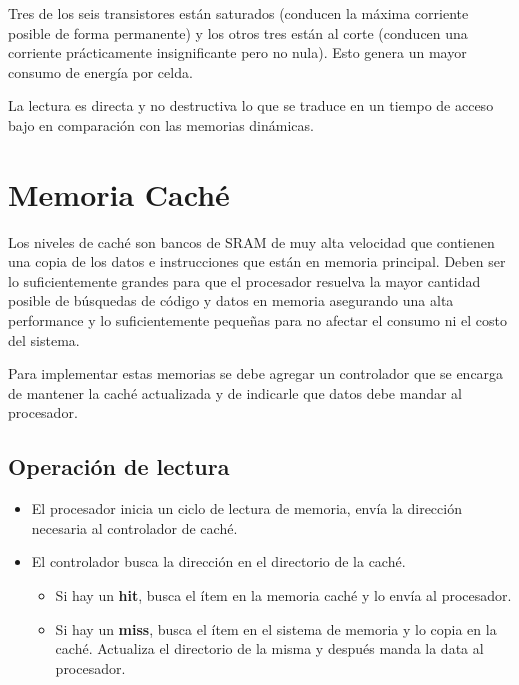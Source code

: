 \begin{itemize}
\begin{itemize}
 		Tres de los seis transistores están saturados (conducen la máxima corriente posible de forma permanente) y los otros tres están al corte (conducen una corriente prácticamente insignificante pero no nula). Esto genera un mayor consumo de energía por celda.
 		
 		La lectura es directa y no destructiva lo que se traduce en un tiempo de acceso bajo en comparación con las memorias dinámicas.
	\end{itemize}

\end{itemize}

\newpage
\section{Memoria Caché}
Los niveles de caché son bancos de SRAM de muy alta velocidad que contienen una copia de los datos e instrucciones que están en memoria principal. Deben ser lo suficientemente grandes para que el procesador resuelva la mayor cantidad posible de búsquedas de código y datos en memoria asegurando una alta performance y lo suficientemente pequeñas para no afectar el consumo ni el costo del sistema.

Para implementar estas memorias se debe agregar un controlador que se encarga de mantener la caché actualizada y de indicarle que datos debe mandar al procesador.

\subsection{Operación de lectura}
\begin{itemize}
	\item El procesador inicia un ciclo de lectura de memoria, envía la dirección necesaria al controlador de caché.
	\item El controlador busca la dirección en el directorio de la caché.
	\begin{itemize}
		\item Si hay un \textbf{hit}, busca el ítem en la memoria caché y lo envía al procesador.
		\item Si hay un \textbf{miss},  busca el ítem en el sistema de memoria y lo copia en la caché. Actualiza el directorio de la misma y después manda la data al procesador.
	\end{itemize}
\end{itemize}

